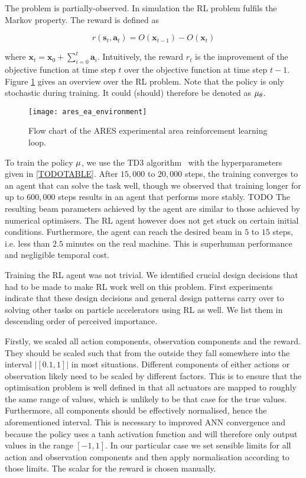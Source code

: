 The problem is partially-observed. In simulation the \ac{RL} problem fulfils the Markov property. The reward is defined as

\begin{equation}
    r(\bm{s}_t, \bm{a}_t) = O(\bm{x}_{t-1}) - O(\bm{x}_t)
\end{equation}

where $\bm{x}_t = \bm{x}_0 + \sum_{i = 0}^t \bm{a}_i$. Intuitively, the reward $r_t$ is the improvement of the objective function at time step $t$ over the objective function at time step $t-1$. Figure \ref{fig:ares_ea_environment} gives an overview over the \ac{RL} problem. Note that the policy is only stochastic during training. It could (should) therefore be denoted as $\mu_\theta$.

\begin{figure}
    \centering
    \texttt{[image: ares\_ea\_environment]}
    \caption{Flow chart of the ARES experimental area reinforcement learning loop.}
    \label{fig:ares_ea_environment}
\end{figure}

To train the policy $\mu$, we use the TD3 algorithm~\cite{TODO} with the hyperparameters given in \cref{TODOTABLE}. After $15,000$ to $20,000$ steps, the training converges to an agent that can solve the task well, though we observed that training longer for up to $600,000$ steps results in an agent that performs more stably. TODO The resulting beam parameters achieved by the agent are similar to those achieved by numerical optimisers. The \ac{RL} agent however does not get stuck on certain initial conditions. Furthermore, the agent can reach the desired beam in $5$ to $15$ steps, i.e. less than $2.5$ minutes on the real machine. This is superhuman performance and negligible temporal cost.

Training the \ac{RL} agent was not trivial. We identified crucial design decisions that had to be made to make \ac{RL} work well on this problem. First experiments indicate that these design decisions and general design patterns carry over to solving other tasks on particle accelerators using \ac{RL} as well. We list them in descending order of perceived importance.

Firstly, we scaled all action components, observation components and the reward. They should be scaled such that from the outside they fall somewhere into the interval $|[0.1,1]|$ in most situations. Different components of either actions or observation likely need to be scaled by different factors. This is to ensure that the optimisation problem is well defined in that all actuators are mapped to roughly the same range of values, which is unlikely to be that case for the true values. Furthermore, all components should be effectively normalised, hence the aforementioned interval. This is necessary to improved \ac{ANN} convergence and because the policy uses a $\text{tanh}$ activation function and will therefore only output values in the range $[-1,1]$. In our particular case we set sensible limits for all action and observation components and then apply normalisation according to those limits. The scalar for the reward is chosen manually.

